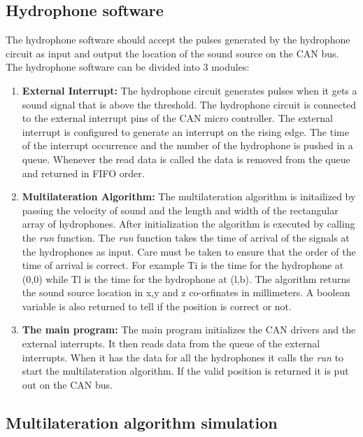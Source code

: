 
\subsection{Hydrophone software}
The hydrophone software should accept the pulses generated by the hydrophone circuit as input and output the location of the sound source on the CAN bus. The hydrophone software can be divided into 3 modules:
\begin{enumerate}
\item \textbf{External Interrupt:} The hydrophone circuit generates pulses when it gets a sound signal that is above the threshold. The hydrophone circuit is connected to the external interrupt pins of the CAN micro controller. The external interrupt is configured to generate an interrupt on the rising edge. The time of the interrupt occurrence and the number of the hydrophone is pushed in a queue. Whenever the read data is called the data is removed from the queue and returned in FIFO order.
\item \textbf{Multilateration Algorithm:} The multilateration algorithm is initailized by passing the velocity of sound and the length and width of the rectangular array of hydrophones. After initialization the algorithm is executed by calling the \textit{run} function. The \textit{run} function takes the time of arrival of the signals at the hydrophones as input. Care must be taken to ensure that the order of the time of arrival is correct. For example Ti is the time for the hydrophone at (0,0) while Tl is the time for the hydrophone at (l,b). The algorithm returns the sound source location in x,y and z co-orfinates in millimeters. A boolean variable is also returned to tell if the position is correct or not.
\item \textbf{The main program:} The main program initializes the CAN drivers and the external interrupts. It then reads data from the queue of the external interrupts. When it has the data for all the hydrophones it calls the \textit{run} to start the multilateration algorithm. If the valid position is returned it is put out on the CAN bus.
\end{enumerate}

\subsection{Multilateration algorithm simulation}

